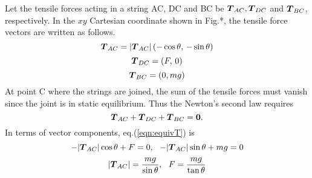 \documentclass[10pt,a4j]{article}
\begin{document}
\begin{enumerate}
	{\small
		Let the tensile forces acting in a string AC, DC and BC be 
		$\mbox{\boldmath $T$}_{AC}, \mbox{\boldmath $T$}_{DC}$ and $\mbox{\boldmath $T$}_{BC}$, respectively. 
		In the $xy$ Cartesian coordinate shown in Fig.*, the tensile force vectors 
		are written as follows.
		\[
			\mbox{\boldmath $T$}_{AC}=|\mbox{\boldmath $T$}_{AC}|\left(-\cos\theta,\, -\sin\theta \right)
		\]
		\[
			\mbox{\boldmath $T$}_{DC}=\left(F,\,0 \right)
		\]
		\[
			\mbox{\boldmath $T$}_{BC}=\left(0,mg \right)
		\]
		At point C where the strings are joined,
		the sum of the tensile forces must vanish since the joint is in 
		static equilibrium. Thus the Newton's second law requires 
		\begin{equation}
			\mbox{\boldmath $T$}_{AC}+ \mbox{\boldmath $T$}_{DC}+\mbox{\boldmath $T$}_{BC}=\mbox{\boldmath $0$}.
			\label{eqn:equivT}
		\end{equation}
		In terms of vector components, eq.(\ref{eqn:equivT}) is 
		\begin{equation}
			-|\fat{T}_{AC}|\cos\theta+F=0
			,\ \ 
			-|\fat{T}_{AC}|\sin\theta+mg=0
			\label{eqn:}
		\end{equation}
		\begin{equation}
			|\fat{T}_{AC}|=\frac{mg}{\sin\theta}, \ \ 
			F=\frac{mg}{\tan\theta}
			\label{eqn:}
		\end{equation}
	}
\end{enumerate}
\end{document}

